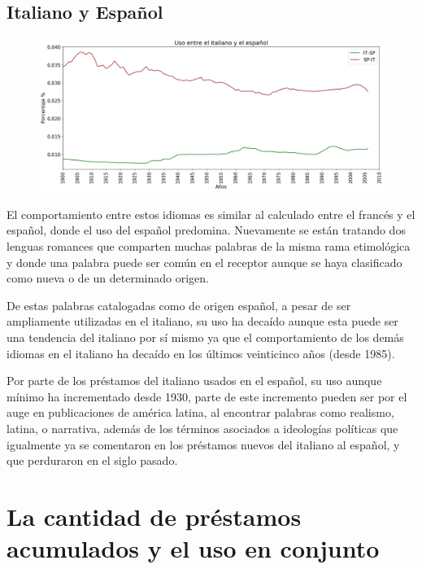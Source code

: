 \newpage
\subsection{Italiano y Español}

\begin{figure}[h!]
	\centering
	\includegraphics[scale=.38]{Cap_3/SF_4_S2_IT.png}
	\label{SF_IS}
	\caption{}
\end{figure}

El comportamiento entre estos idiomas es similar al calculado entre el francés y el español, donde el uso del español predomina.  Nuevamente se están tratando dos lenguas romances  que comparten muchas palabras de la misma rama etimológica y donde una palabra puede ser común en el receptor aunque se haya clasificado como nueva o de un determinado origen.     

De estas palabras catalogadas como de origen español,  a pesar de ser ampliamente utilizadas en el italiano, su uso ha decaído aunque esta puede ser una tendencia del italiano por sí mismo ya que el comportamiento de los demás idiomas en el italiano ha decaído en los últimos veinticinco años (desde 1985). 

Por parte de los préstamos del italiano usados en el español,  su uso aunque mínimo ha incrementado desde 1930,  parte de este incremento pueden ser por el auge en publicaciones de américa latina,  al encontrar palabras como realismo, latina, o narrativa, además de los  términos asociados a ideologías políticas que igualmente ya se comentaron en los préstamos nuevos del italiano al español, y que perduraron en el siglo pasado.



\newpage
\section{La cantidad de préstamos acumulados y el uso en conjunto}

